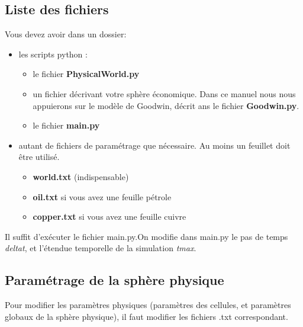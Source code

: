 \documentclass[12pt,a4paper]{article}%
\begin{document}
\subsection{Liste des fichiers}

Vous devez avoir dans un dossier:

\begin{itemize}
\item les scripts python :

\begin{itemize}
\item le fichier \textbf{PhysicalWorld.py}

\item un fichier décrivant votre sphère économique. Dans
ce manuel nous nous appuierons sur le modèle de Goodwin, décrit ans le fichier \textbf{Goodwin.py}.

\item le fichier \textbf{main.py}
\end{itemize}
\end{itemize}

\begin{itemize}
\item autant de fichiers de paramétrage que nécessaire. Au moins un feuillet doit être utilisé.

\begin{itemize}
\item \textbf{world.txt} (indispensable)

\item \textbf{oil.txt} si vous avez une feuille pétrole

\item \textbf{copper.txt} si vous avez une feuille cuivre

\end{itemize}
\end{itemize}

Il suffit d'exécuter le fichier main.py.\newline On modifie dans main.py le
pas de temps \textit{deltat}, et l'étendue temporelle de la simulation
\textit{tmax}.

\subsection{Paramétrage de la sphère physique}

Pour modifier les paramètres physiques (paramètres des cellules, et
paramètres globaux de la sphère physique), il faut modifier les
fichiers .txt correspondant.
\end{document}
